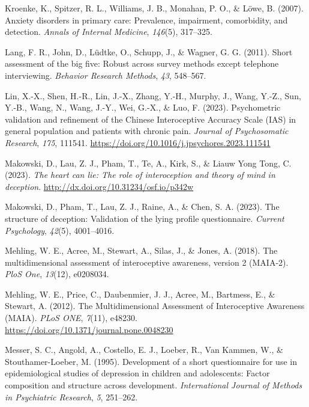 \documentclass[
  man,
  floatsintext,
  longtable,
  nolmodern,
  notxfonts,
  notimes,
  colorlinks=true,linkcolor=blue,citecolor=blue,urlcolor=blue]{apa7}
\newlength{\cslhangindent}
\newenvironment{CSLReferences}[2] %
 {\begin{list}{}{%
  \setlength{\itemindent}{0pt}
  \setlength{\leftmargin}{0pt}
  \setlength{\parsep}{0pt}
  \ifodd #1
   \setlength{\leftmargin}{\cslhangindent}
   \setlength{\itemindent}{-1\cslhangindent}
  \fi
  \setlength{\itemsep}{#2\baselineskip}}}
 {\end{list}}
\begin{document}
\begin{CSLReferences}{1}{0}
Kroenke, K., Spitzer, R. L., Williams, J. B., Monahan, P. O., \& Löwe,
B. (2007). Anxiety disorders in primary care: Prevalence, impairment,
comorbidity, and detection. \emph{Annals of Internal Medicine},
\emph{146}(5), 317--325.

Lang, F. R., John, D., Lüdtke, O., Schupp, J., \& Wagner, G. G. (2011).
Short assessment of the big five: Robust across survey methods except
telephone interviewing. \emph{Behavior Research Methods}, \emph{43},
548--567.

Lin, X.-X., Shen, H.-R., Lin, J.-X., Zhang, Y.-H., Murphy, J., Wang,
Y.-Z., Sun, Y.-B., Wang, N., Wang, J.-Y., Wei, G.-X., \& Luo, F. (2023).
Psychometric validation and refinement of the Chinese Interoceptive
Accuracy Scale (IAS) in general population and patients with chronic
pain. \emph{Journal of Psychosomatic Research}, \emph{175}, 111541.
\url{https://doi.org/10.1016/j.jpsychores.2023.111541}

Makowski, D., Lau, Z. J., Pham, T., Te, A., Kirk, S., \& Liauw Yong
Tong, C. (2023). \emph{The heart can lie: The role of interoception and
theory of mind in deception}.
\url{http://dx.doi.org/10.31234/osf.io/p342w}

Makowski, D., Pham, T., Lau, Z. J., Raine, A., \& Chen, S. A. (2023).
The structure of deception: Validation of the lying profile
questionnaire. \emph{Current Psychology}, \emph{42}(5), 4001--4016.

Mehling, W. E., Acree, M., Stewart, A., Silas, J., \& Jones, A. (2018).
The multidimensional assessment of interoceptive awareness, version 2
(MAIA-2). \emph{PloS One}, \emph{13}(12), e0208034.

Mehling, W. E., Price, C., Daubenmier, J. J., Acree, M., Bartmess, E.,
\& Stewart, A. (2012). The Multidimensional Assessment of Interoceptive
Awareness (MAIA). \emph{PLoS ONE}, \emph{7}(11), e48230.
\url{https://doi.org/10.1371/journal.pone.0048230}

Messer, S. C., Angold, A., Costello, E. J., Loeber, R., Van Kammen, W.,
\& Stouthamer-Loeber, M. (1995). Development of a short questionnaire
for use in epidemiological studies of depression in children and
adolescents: Factor composition and structure across development.
\emph{International Journal of Methods in Psychiatric Research},
\emph{5}, 251--262.


\end{CSLReferences}
\end{document}
